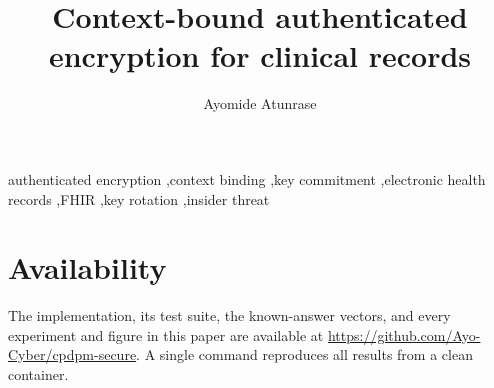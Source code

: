 \documentclass[preprint,12pt,a4paper]{elsarticle}
\begin{document}
\begin{frontmatter}

\title{Context-bound authenticated encryption for clinical records}

\author[1]{Ayomide Atunrase}

\begin{abstract}

\end{abstract}

\begin{keyword}
authenticated encryption \sep context binding \sep key commitment \sep electronic health records \sep FHIR \sep key rotation \sep insider threat
\end{keyword}

\end{frontmatter}









\section*{Availability}
The implementation, its test suite, the known-answer vectors, and every experiment and figure in this paper are available at \url{https://github.com/Ayo-Cyber/cpdpm-secure}. A single command reproduces all results from a clean container.



\end{document}
